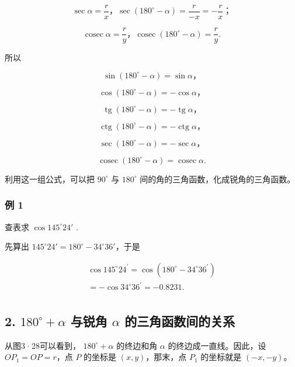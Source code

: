 \[
\sec \alpha = \frac {r}{x}\text{，} \sec (180 ^{\circ} - \alpha) = \frac {r}{- x} = - \frac {r}{x}\text{；}
\]

\[
\operatorname{cosec} \alpha = \frac {r}{y}\text{，} \operatorname{cosec} (180 ^{\circ} - \alpha) = \frac {r}{y}.
\]

所以

\[
\sin (180 ^{\circ} - \alpha) = \sin \alpha \text{，}
\]

\[
\cos (180 ^{\circ} - \alpha) = - \cos \alpha \text{，}
\]

\[
\operatorname{tg} (180 ^{\circ} - \alpha) = - \operatorname{tg} \alpha \text{，}
\]

\[
\operatorname{ctg} (180 ^{\circ} - \alpha) = - \operatorname{ctg} \alpha \text{，}
\]

\[
\sec (180 ^{\circ} - \alpha) = - \sec \alpha \text{，}
\]

\[
\operatorname{cosec} (180 ^{\circ} - \alpha) = \operatorname{cosec} \alpha .
\]

利用这一组公式，可以把 \(90^{\circ}\) 与 \(180^{\circ}\)
间的角的三角函数，化成锐角的三角函数。

\subsubsection{例 1}

查表求 \(\cos 145^{\circ}24'\) .

 先算出
\(145^{\circ}24' = 180^{\circ} - 34^{\circ}36'\)，于是

\[
\begin{array}{l} \cos 145 ^{\circ} 24 ^{\prime} = \cos (180 ^{\circ} - 34 ^{\circ} 36 ^{\prime}) \\ = - \cos 34 ^{\circ} 36 ^{\prime} = - 0.8231. \\ \end{array}
\]

\subsection{\texorpdfstring{2. \(180^{\circ} + \alpha\) 与锐角 \(\alpha\) 的三角函数间的关系}{2. 180\^{}\{\textbackslash circ\} + \textbackslash alpha 与锐角 \textbackslash alpha 的三角函数间的关系}}\label{circ-alpha-ux4e0eux9510ux89d2-alpha-ux7684ux4e09ux89d2ux51fdux6570ux95f4ux7684ux5173ux7cfb}

从图3·28可以看到， \(180^{\circ} + \alpha\) 的终边和角 \(\alpha\)
的终边成一直线。因此，设 \(OP_{1} = OP = r\)，点 \(P\) 的坐标是
\((x, y)\)，那末，点 \(P_{1}\) 的坐标就是 \((-x, -y)\)。


